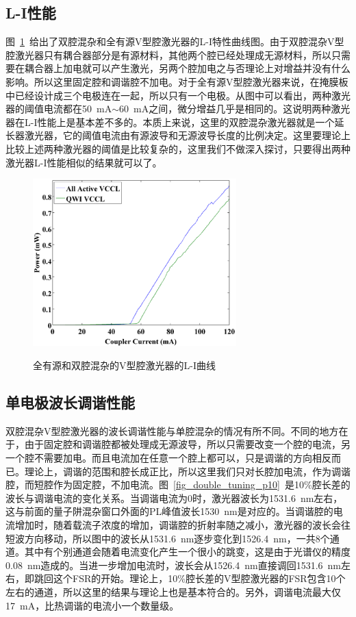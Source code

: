\documentclass{ZJUthesis}
\begin{document}
\subsection{L-I性能}

图~\ref{fig_double_li}~给出了双腔混杂和全有源V型腔激光器的L-I特性曲线图。由于双腔混杂V型腔激光器只有耦合器部分是有源材料，其他两个腔已经处理成无源材料，所以只需要在耦合器上加电就可以产生激光，另两个腔加电之与否理论上对增益并没有什么影响。所以这里固定腔和调谐腔不加电。对于全有源V型腔激光器来说，在掩膜板中已经设计成三个电极连在一起，所以只有一个电极。从图中可以看出，两种激光器的阈值电流都在50~mA$\sim$60~mA之间，微分增益几乎是相同的。这说明两种激光器在L-I性能上是基本差不多的。本质上来说，这里的双腔混杂激光器就是一个延长器激光器，它的阈值电流由有源波导和无源波导长度的比例决定。这里要理论上比较上述两种激光器的阈值是比较复杂的，这里我们不做深入探讨，只要得出两种激光器L-I性能相似的结果就可以了。

\begin{figure}[htbp]
  \centering
  \includegraphics[width=0.7\textwidth]{./Pictures/double_li.eps}\\
  \caption{全有源和双腔混杂的V型腔激光器的L-I曲线}
  \label{fig_double_li}
\end{figure}

\subsection{单电极波长调谐性能}

双腔混杂V型腔激光器的波长调谐性能与单腔混杂的情况有所不同。不同的地方在于，由于固定腔和调谐腔都被处理成无源波导，所以只需要改变一个腔的电流，另一个腔不需要加电。而且电流加在任意一个腔上都可以，只是调谐的方向相反而已。理论上，调谐的范围和腔长成正比，所以这里我们只对长腔加电流，作为调谐腔，而短腔作为固定腔，不加电流。图~\ref{fig_double_tuning_p10}~是10\%腔长差的波长与调谐电流的变化关系。当调谐电流为0时，激光器波长为1531.6~nm左右，这与前面的量子阱混杂窗口外面的PL峰值波长1530~nm是对应的。当调谐腔的电流增加时，随着载流子浓度的增加，调谐腔的折射率随之减小，激光器的波长会往短波方向移动，所以图中的波长从1531.6~nm逐步变化到1526.4~nm，一共8个通道。其中有个别通道会随着电流变化产生一个很小的跳变，这是由于光谱仪的精度0.08~nm造成的。当进一步增加电流时，波长会从1526.4~nm直接调回1531.6~nm左右，即跳回这个FSR的开始。理论上，10\%腔长差的V型腔激光器的FSR包含10个左右的通道，所以这里的结果与理论上也是基本符合的。另外，调谐电流最大仅17~mA，比热调谐的电流小一个数量级。
\end{document}
